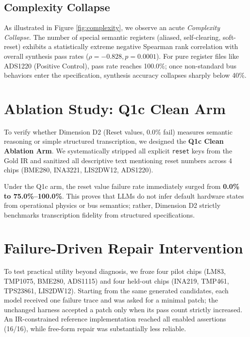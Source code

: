 \documentclass[conference]{IEEEtran}
\begin{document}
\subsection{Complexity Collapse}
As illustrated in Figure \ref{fig:complexity}, we observe an acute \textit{Complexity Collapse}. The number of special semantic registers (aliased, self-clearing, soft-reset) exhibits a statistically extreme negative Spearman rank correlation with overall synthesis pass rates ($\rho = -0.828, p = 0.0001$). For pure register files like ADS1220 (Positive Control), pass rate reaches 100.0\%; once non-standard bus behaviors enter the specification, synthesis accuracy collapses sharply below 40\%.

\section{Ablation Study: Q1c Clean Arm}
To verify whether Dimension D2 (Reset values, 0.0\% fail) measures semantic reasoning or simple structured transcription, we designed the \textbf{Q1c Clean Ablation Arm}. We systematically stripped all explicit \texttt{reset} keys from the Gold IR and sanitized all descriptive text mentioning reset numbers across 4 chips (BME280, INA3221, LIS2DW12, ADS1220).

Under the Q1c arm, the reset value failure rate immediately surged from \textbf{0.0\% to 75.0\%--100.0\%}. This proves that LLMs do not infer default hardware states from operational physics or bus semantics; rather, Dimension D2 strictly benchmarks transcription fidelity from structured specifications.

\section{Failure-Driven Repair Intervention}
To test practical utility beyond diagnosis, we froze four pilot chips (LM83, TMP1075, BME280, ADS1115) and four held-out chips (INA219, TMP461, TPS23861, LIS2DW12). Starting from the same generated candidates, each model received one failure trace and was asked for a minimal patch; the unchanged harness accepted a patch only when its pass count strictly increased. An IR-constrained reference implementation reached all enabled assertions (16/16), while free-form repair was substantially less reliable.

\begin{table}[t]
\centering
\caption{Failure-driven minimal repair over eight chips. Success means a strict increase over the same baseline candidate; Wilson intervals are chip-level.}
\label{tab:repair_intervention}
\scriptsize
{}%
\end{table}
\end{document}
